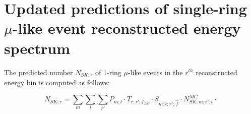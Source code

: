 \clearpage

\section {Updated predictions of single-ring $\mu$-like event reconstructed energy spectrum}
\label{sec:spectrum_prediction}

The predicted number $N_{SK;r}$
of 1-ring $\mu$-like events in the $r^{th}$ reconstructed energy bin
is computed as follows:

\begin{equation}
\displaystyle
  N_{SK;r} =
    \sum_{m} \sum_{t} \sum_{r\prime}
        P_{m;t} \cdot
        T_{r;r\prime;f_{{\Delta}E}} \cdot
        S_{m;t;r\prime;\vec{f}} \cdot
        N_{SK;m;r\prime;t}^{MC} \cdot
\label{eq:far_prediction}
\end{equation}

